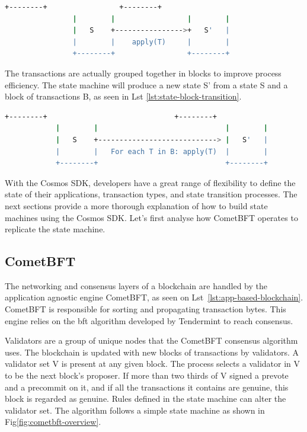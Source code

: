 \begin{lstlisting}[language=bash, caption=State machine transition. Source:\cite{app-based-blockchain},label={lst:state-transition}]
                +--------+                 +--------+
                |        |                 |        |
                |   S    +---------------->+   S'   |
                |        |    apply(T)     |        |
                +--------+                 +--------+
\end{lstlisting}

The transactions are actually grouped together in blocks to improve process efficiency. The state machine will produce a new state S' from a state S and a block of transactions B, as seen in Lst \ref{lst:state-block-transition}.
\newpage
\begin{lstlisting}[language=bash, caption=Block of bundled transactions. Source:\cite{app-based-blockchain},label={lst:state-block-transition}]
            +--------+                              +--------+
            |        |                              |        |
            |   S    +----------------------------> |   S'   |
            |        |   For each T in B: apply(T)  |        |
            +--------+                              +--------+
\end{lstlisting}

With the Cosmos SDK, developers have a great range of flexibility to define the state of their applications, transaction types, and state transition processes. The next sections provide a more thorough explanation of how to build state machines using the Cosmos SDK. Let's first analyse how CometBFT operates to replicate the state machine.

\subsection{CometBFT}

The networking and consensus layers of a blockchain are handled by the application agnostic engine CometBFT, as seen on Lst~\ref{lst:app-based-blockchain}. CometBFT is responsible for sorting and propagating transaction bytes. This engine relies on the \gls{bft} algorithm developed by Tendermint to reach consensus.

Validators are a group of unique nodes that the CometBFT consensus algorithm uses. The blockchain is updated with new blocks of transactions by validators. A validator set V is present at any given block. The process selects a validator in V to be the next block's proposer. If more than two thirds of V signed a prevote and a precommit on it, and if all the transactions it contains are genuine, this block is regarded as genuine. Rules defined in the state machine can alter the validator set. The algorithm follows a simple state machine as shown in Fig\ref{fig:cometbft-overview}.

